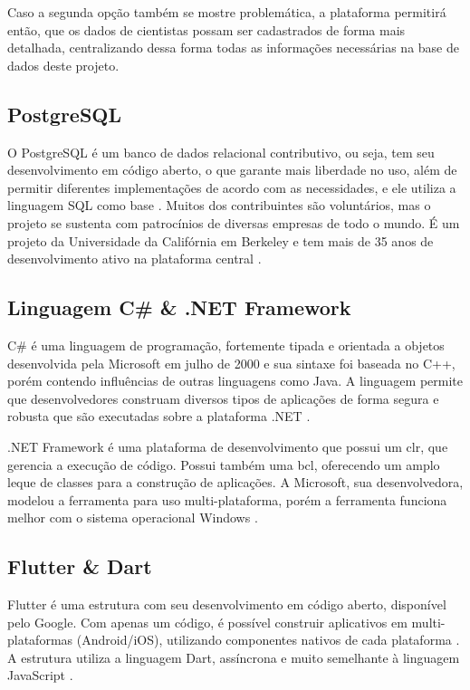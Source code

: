 Caso a segunda opção também se mostre problemática, a plataforma permitirá então, que os dados de cientistas possam ser cadastrados de forma mais detalhada, centralizando dessa forma todas as informações necessárias na base de dados deste projeto.

\subsection{PostgreSQL}\label{subsec:postgresql}

O PostgreSQL é um banco de dados relacional contributivo, ou seja, tem seu desenvolvimento em código aberto, o que garante mais liberdade no uso, além de permitir diferentes implementações de acordo com as necessidades, e ele utiliza a linguagem SQL como base \cite{Amazon}. Muitos dos contribuintes são voluntários, mas o projeto se sustenta com patrocínios de diversas empresas de todo o mundo. É um projeto da Universidade da Califórnia em Berkeley e tem mais de 35 anos de desenvolvimento ativo na plataforma central \cite{PostgreSQL}.

\subsection{Linguagem C{\#} {\&} .NET Framework}\label{subsec:csharp}

C{\#} é uma linguagem de programação, fortemente tipada e orientada a objetos desenvolvida pela Microsoft em julho de 2000 e sua sintaxe foi baseada no C++, porém contendo influências de outras linguagens como Java. A linguagem permite que desenvolvedores construam diversos tipos de aplicações de forma segura e robusta que são executadas sobre a plataforma .NET \cite{CSharp}.

.NET Framework é uma plataforma de desenvolvimento que possui um \gls{clr}, que gerencia a execução de código. Possui também uma \gls{bcl}, oferecendo um amplo leque de classes para a construção de aplicações. A Microsoft, sua desenvolvedora, modelou a ferramenta para uso multi-plataforma, porém a ferramenta funciona melhor com o sistema operacional Windows \cite{CSharpDevelopment}.

\subsection{Flutter {\&} Dart}\label{subsec:flutterdart}

Flutter é uma estrutura com seu desenvolvimento em código aberto, disponível pelo Google. Com apenas um código, é possível construir aplicativos em multi-plataformas (Android/iOS), utilizando componentes nativos de cada plataforma \cite{Flutter}. A estrutura utiliza a linguagem Dart, assíncrona e muito semelhante à linguagem JavaScript \cite{Dart}.

